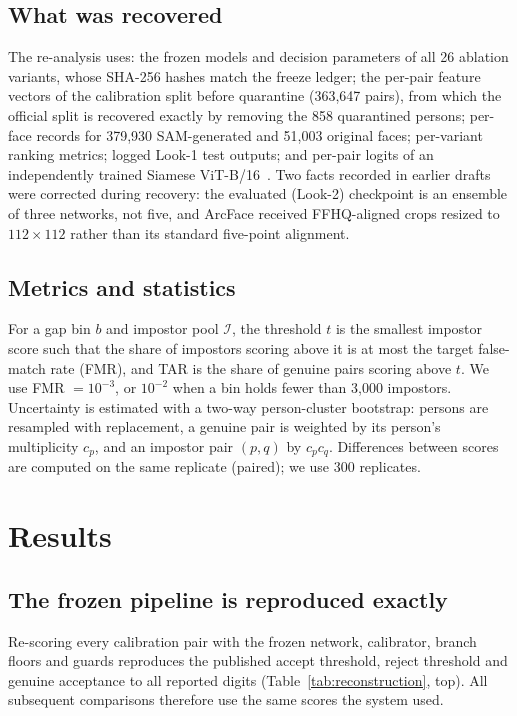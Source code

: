\documentclass[journal]{IEEEtran}
\begin{document}
\subsection{What was recovered}
The re-analysis uses: the frozen models and decision parameters of all 26 ablation variants, whose SHA-256 hashes match the freeze ledger; the per-pair feature vectors of the calibration split before quarantine (363,647 pairs), from which the official split is recovered exactly by removing the 858 quarantined persons; per-face records for 379,930 SAM-generated and 51,003 original faces; per-variant ranking metrics; logged Look-1 test outputs; and per-pair logits of an independently trained Siamese ViT-B/16~\cite{dosovitskiy2021vit,chopra2005siamese}. Two facts recorded in earlier drafts were corrected during recovery: the evaluated (Look-2) checkpoint is an ensemble of three networks, not five, and ArcFace received FFHQ-aligned crops resized to $112\times112$ rather than its standard five-point alignment.

\subsection{Metrics and statistics}
For a gap bin $b$ and impostor pool $\mathcal{I}$, the threshold $t$ is the smallest impostor score such that the share of impostors scoring above it is at most the target false-match rate (FMR), and TAR is the share of genuine pairs scoring above $t$. We use FMR $=10^{-3}$, or $10^{-2}$ when a bin holds fewer than 3,000 impostors. Uncertainty is estimated with a two-way person-cluster bootstrap: persons are resampled with replacement, a genuine pair is weighted by its person's multiplicity $c_p$, and an impostor pair $(p,q)$ by $c_p c_q$. Differences between scores are computed on the same replicate (paired); we use 300 replicates.

\section{Results}
\subsection{The frozen pipeline is reproduced exactly}
\label{sec:recon}
Re-scoring every calibration pair with the frozen network, calibrator, branch floors and guards reproduces the published accept threshold, reject threshold and genuine acceptance to all reported digits (Table~\ref{tab:reconstruction}, top). All subsequent comparisons therefore use the same scores the system used.
\end{document}
